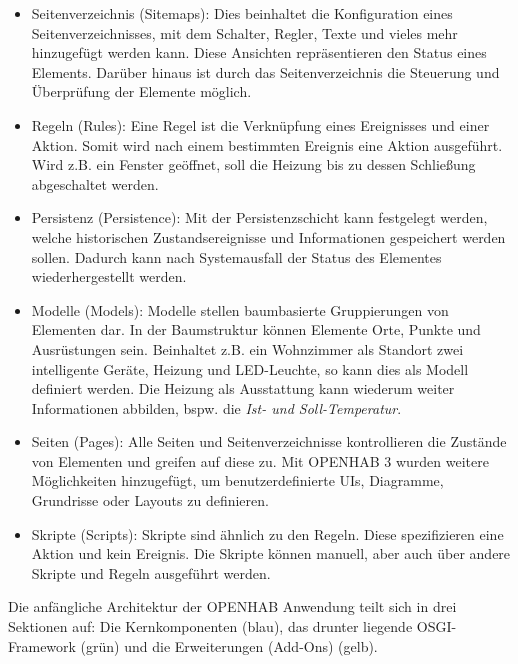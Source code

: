     \begin{itemize}
        \item Seitenverzeichnis (Sitemaps): Dies beinhaltet die Konfiguration eines Seitenverzeichnisses, mit dem Schalter, 
        Regler, Texte und vieles mehr hinzugefügt werden kann. Diese Ansichten repräsentieren den Status eines Elements. Darüber hinaus ist 
        durch das Seitenverzeichnis die Steuerung und Überprüfung der Elemente möglich.
        \item Regeln (Rules): Eine Regel ist die Verknüpfung eines Ereignisses und einer Aktion. Somit wird nach einem bestimmten 
        Ereignis eine Aktion ausgeführt. Wird z.B. ein Fenster geöffnet, soll die Heizung bis zu dessen Schließung abgeschaltet werden. 
        \item Persistenz (Persistence): Mit der Persistenzschicht kann festgelegt werden, welche historischen Zustandsereignisse 
        und Informationen gespeichert werden sollen. Dadurch kann nach Systemausfall der Status des Elementes wiederhergestellt werden. 
        \item Modelle (Models): Modelle stellen baumbasierte Gruppierungen von Elementen dar. In der Baumstruktur können Elemente 
        Orte, Punkte und Ausrüstungen sein. Beinhaltet z.B. ein Wohnzimmer als Standort zwei intelligente Geräte, Heizung und LED-Leuchte, so kann dies als Modell 
        definiert werden. Die Heizung als Ausstattung kann wiederum weiter Informationen abbilden, bspw. die \textit{Ist- und Soll-Temperatur}.
        \item Seiten (Pages): Alle Seiten und Seitenverzeichnisse kontrollieren die Zustände von Elementen und greifen auf diese zu. 
        Mit \acs{OPENHAB} 3 wurden weitere Möglichkeiten hinzugefügt, um benutzerdefinierte \acs{UI}s, Diagramme, Grundrisse oder 
        Layouts zu definieren. 
        \item Skripte (Scripts): Skripte sind ähnlich zu den Regeln. Diese spezifizieren eine Aktion und kein Ereignis. Die Skripte 
        können manuell, aber auch über andere Skripte und Regeln ausgeführt werden. 
    \end{itemize}
    Die anfängliche Architektur der \acs{OPENHAB} Anwendung teilt sich in drei Sektionen auf: Die Kernkomponenten (blau), das drunter 
    liegende \acs{OSGI}-Framework (grün) und die Erweiterungen (Add-Ons) (gelb). 
